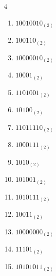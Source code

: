 \begin{multicols}{4}
\begin{enumerate}
        \phantom{$=255$}

  \item $10010010_{(2)}$

        \phantom{$=146$}

\columnbreak %

  \item $100110_{(2)}$

        \phantom{$=38$}

  \item $10000010_{(2)}$

        \phantom{$=130$}

  \item $10001_{(2)}$

        \phantom{$=17$}

  \item $1101001_{(2)}$

        \phantom{$=105$}

  \item $10100_{(2)}$

        \phantom{$=20$}

  \item $11011110_{(2)}$

        \phantom{$=222$}

  \item $1000111_{(2)}$

        \phantom{$=71$}

  \item $1010_{(2)}$

        \phantom{$=10$}

  \item $101001_{(2)}$

        \phantom{$=41$}

  \item $1010111_{(2)}$

        \phantom{$=87$}

  \item $10011_{(2)}$

        \phantom{$=19$}

  \item $10000000_{(2)}$

        \phantom{$=128$}

  \item $11101_{(2)}$

        \phantom{$=29$}

  \item $10101011_{(2)}$


\end{enumerate}
\end{multicols}
